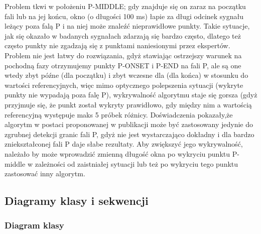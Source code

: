 Problem tkwi w położeniu P-MIDDLE; gdy znajduje się on zaraz na początku fali lub na jej końcu, okno (o długości 100 ms) łapie za długi odcinek sygnału leżący poza falą P i na niej może znaleźć nieprawidłowe punkty. Takie sytuacje, jak się okazało w badanych sygnałach zdarzają się bardzo często, dlatego też często punkty nie zgadzają się z punktami naniesionymi przez ekspertów. Problem nie jest łatwy do rozwiązania, gdyż stawiając ostrzejszy warunek na pochodną fazy otrzymujemy punkty P-ONSET i P-END na fali P, ale są one wtedy zbyt późne (dla początku) i zbyt wczesne dla (dla końca) w stosunku do wartości referencyjnych, więc mimo optycznego polepszenia sytuacji (wykryte punkty nie wypadają poza falę P), wykrywalność algorytmu staje się gorsza (gdyż przyjmuje się, że punkt został wykryty prawidłowo, gdy między nim a wartością referencyjną występuje maks 5 próbek różnicy. 
Doświadczenia pokazały,że algorytm w postaci proponowanej w publikacji \cite{Waves_aNMfADoEFPBotPT} może być zastosowany jedynie do zgrubnej detekcji granic fali P, gdyż nie jest wystarczająco dokładny i dla bardzo zniekształconej fali P daje słabe rezultaty. Aby zwiększyć jego wykrywalność, należało by może  wprowadzić zmienną długość okna po wykryciu punktu P-middle w zależności od zaistniałej sytuacji  lub też po wykryciu tego punktu zastosować inny algorytm.

\subsection{Diagramy klasy i sekwencji}
\subsubsection{Diagram klasy}
